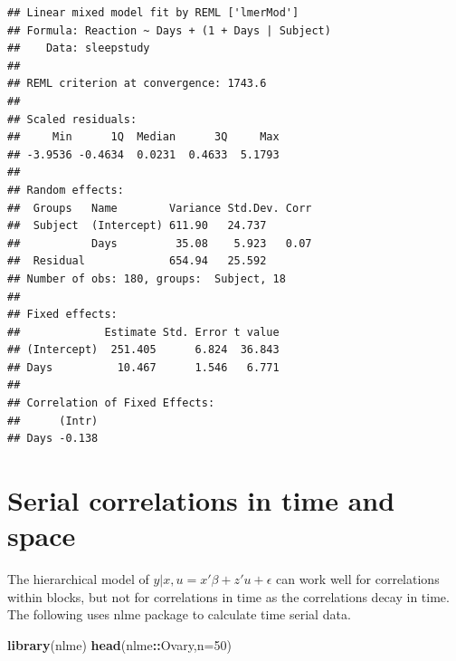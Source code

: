 \documentclass[]{book}
\newenvironment{Shaded}{\begin{snugshade}}{\end{snugshade}}
\newcommand{\KeywordTok}[1]{\textcolor[rgb]{0.13,0.29,0.53}{\textbf{#1}}}
\newcommand{\DataTypeTok}[1]{\textcolor[rgb]{0.13,0.29,0.53}{#1}}
\newcommand{\DecValTok}[1]{\textcolor[rgb]{0.00,0.00,0.81}{#1}}
\newcommand{\OperatorTok}[1]{\textcolor[rgb]{0.81,0.36,0.00}{\textbf{#1}}}
\newcommand{\NormalTok}[1]{#1}
\begin{document}
\begin{verbatim}
## Linear mixed model fit by REML ['lmerMod']
## Formula: Reaction ~ Days + (1 + Days | Subject)
##    Data: sleepstudy
## 
## REML criterion at convergence: 1743.6
## 
## Scaled residuals: 
##     Min      1Q  Median      3Q     Max 
## -3.9536 -0.4634  0.0231  0.4633  5.1793 
## 
## Random effects:
##  Groups   Name        Variance Std.Dev. Corr
##  Subject  (Intercept) 611.90   24.737       
##           Days         35.08    5.923   0.07
##  Residual             654.94   25.592       
## Number of obs: 180, groups:  Subject, 18
## 
## Fixed effects:
##             Estimate Std. Error t value
## (Intercept)  251.405      6.824  36.843
## Days          10.467      1.546   6.771
## 
## Correlation of Fixed Effects:
##      (Intr)
## Days -0.138
\end{verbatim}

\section{Serial correlations in time and
space}\label{serial-correlations-in-time-and-space}

The hierarchical model of \(y|x, u = x'\beta+z'u+\epsilon\) can work
well for correlations within blocks, but not for correlations in time as
the correlations decay in time. The following uses nlme package to
calculate time serial data.

\begin{Shaded}
\begin{Highlighting}[]
\KeywordTok{library}\NormalTok{(nlme)}
\KeywordTok{head}\NormalTok{(nlme}\OperatorTok{::}\NormalTok{Ovary,}\DataTypeTok{n=}\DecValTok{50}\NormalTok{)}
\end{Highlighting}
\end{Shaded}
\end{document}
